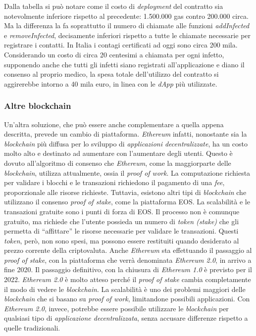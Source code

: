 Dalla tabella si può notare come il costo di \textit{deployment} del contratto sia notevolmente inferiore rispetto al precedente: 1.500.000 gas contro 200.000 circa. 
Ma la differenza la fa soprattutto il numero di chiamate alle funzioni \textit{addInfected} e \textit{removeInfected}, decisamente inferiori rispetto a tutte le chiamate necessarie per registrare i contatti.
In Italia i contagi certificati ad oggi sono circa 200 mila. Considerando un costo di circa 20 centesimi a chiamata per ogni infetto, supponendo anche che tutti gli infetti siano registrati all’applicazione e diano il consenso al proprio medico, la spesa totale dell’utilizzo del contratto si aggirerebbe intorno a 40 mila euro, in linea con le \textit{dApp} più utilizzate. \\
\subsubsection{Altre blockchain}
Un’altra soluzione, che può essere anche complementare a quella appena descritta, prevede un cambio di piattaforma. \textit{Ethereum} infatti, nonostante sia la \textit{blockchain} più diffusa per lo sviluppo di \textit{applicazioni decentralizzate}, ha un costo molto alto e destinato ad aumentare con l’aumentare degli utenti.
Questo è dovuto all’algoritmo di consenso che \textit{Ethereum}, come la maggiorparte delle \textit{blockchain}, utilizza attualmente, ossia il \textit{proof of work}. La computazione richiesta per validare i blocchi e le transazioni richiedono il pagamento di una \textit{fee}, proporzionale alle risorse richieste. 
Tuttavia, esistono altri tipi di \textit{blockchain} che utilizzano il consenso \textit{proof of stake}, come la piattaforma EOS.
La scalabilità e le transazioni gratuite sono i punti di forza di EOS. Il processo non è comunque gratuito, ma richiede che l’utente possieda un numero di \textit{token (stake)} che gli permetta di “affittare” le risorse necessarie per validare le transazioni. Questi \textit{token}, però, non sono spesi, ma possono essere restituiti quando desiderato al prezzo corrente della criptovaluta.
Anche \textit{Ethereum} sta effettuando il passaggio al \textit{proof of stake}, con la piattaforma che verrà denominata \textit{Ethereum 2.0}, in arrivo a fine 2020. 
Il passaggio definitivo, con la chiusura di \textit{Ethereum 1.0} è previsto per il 2022.
\textit{Ethereum 2.0} è molto atteso perché il \textit{proof of stake} cambia completamente il modo di vedere le \textit{blockchain}. La scalabilità è uno dei problemi maggiori delle \textit{blockchain} che si basano su \textit{proof of work}, limitandone possibili applicazioni. Con \textit{Ethereum 2.0}, invece, potrebbe essere possibile utilizzare le \textit{blockchain} per qualsiasi tipo di \textit{applicazione decentralizzata}, senza accusare differenze rispetto a quelle tradizionali.

